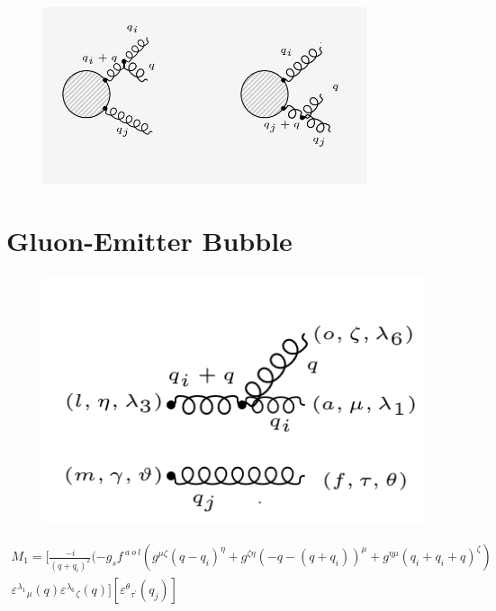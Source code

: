 
\begin{figure}[ht!]
\centering
\includegraphics[width=0.85\textwidth]{images/GG/GGDiagrams.png}
\end{figure}
\pagebreak
\section{Gluon-Emitter Bubble}
\begin{figure}[ht!]
\centering
\includegraphics[scale=0.7]{images/GG/M1gg.png}
\end{figure}
\begin{equation}
\begin{split}
M_1=[\frac{-i}{(q +q_i)^2}(-g_s f^{\:a\:o\:l}(g^{{\mu}{\zeta}}(q -q_i)^{\eta}+g^{{\zeta}{\eta}}(-q-(q +q_i))^{\mu}+g^{{\eta}{\mu}}(q_i +q_i+q)^{\zeta})\\
{\varepsilon^{\lambda_1}}_{\mu} (q) {\varepsilon^{\lambda_6}}_{\zeta} (q)][{{\varepsilon^{\theta}}_{{\tau}^{\prime}}} (q_j)]
\end{split}
\end{equation}

